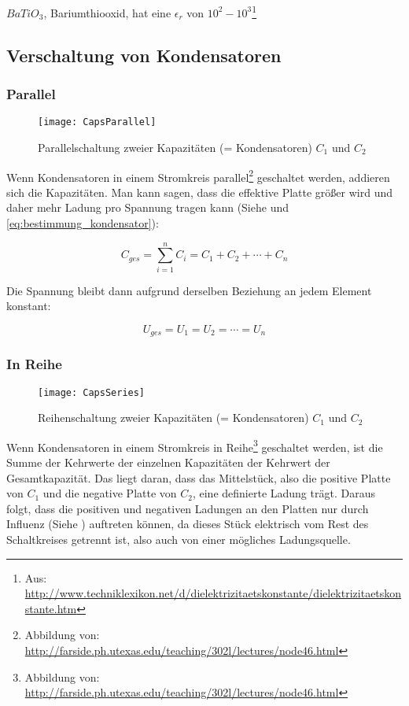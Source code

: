 \begin{NiceToKnow}
$BaTiO_3$, Bariumthiooxid, hat eine $\epsilon_r$ von $10^2-10^3$\footnote{Aus: \url{http://www.techniklexikon.net/d/dielektrizitaetskonstante/dielektrizitaetskonstante.htm}}
\end{NiceToKnow}


\subsection{Verschaltung von Kondensatoren}

\subsubsection{Parallel}

\begin{figure}[h!]
	\centering
	\texttt{[image: CapsParallel]}
	\caption{Parallelschaltung zweier Kapazitäten (= Kondensatoren) $C_1$ und $C_2$}
\end{figure}

Wenn Kondensatoren in einem Stromkreis parallel\footnote{Abbildung von: \url{http://farside.ph.utexas.edu/teaching/302l/lectures/node46.html}} geschaltet werden, addieren sich die Kapazitäten. Man kann sagen, dass die effektive Platte größer wird und daher mehr Ladung pro Spannung tragen kann (Siehe  und \ref{eq:bestimmung_kondensator}):

\begin{equation}
	C_{ges} = \sum\limits_{i=1}^n C_i = C_1 + C_2 + \cdots + C_n
\end{equation}

\noindent Die Spannung bleibt dann aufgrund derselben Beziehung an jedem Element konstant:

\begin{equation}
	U_{ges} = U_1 = U_2 = \cdots = U_n
\end{equation}


\subsubsection{In Reihe}

\begin{figure}[h!]
	\centering
	\texttt{[image: CapsSeries]}
	\caption{Reihenschaltung zweier Kapazitäten (= Kondensatoren) $C_1$ und $C_2$}
\end{figure}

Wenn Kondensatoren in einem Stromkreis in Reihe\footnote{Abbildung von: \url{http://farside.ph.utexas.edu/teaching/302l/lectures/node46.html}} geschaltet werden, ist die Summe der Kehrwerte der einzelnen Kapazitäten der Kehrwert der Gesamtkapazität. Das liegt daran, dass das \glqq Mittelstück\grqq , also die positive Platte von $C_1$ und die negative Platte von $C_2$, eine definierte Ladung trägt. Daraus folgt, dass die positiven und negativen Ladungen an den Platten nur durch Influenz (Siehe ) auftreten können, da dieses Stück elektrisch vom Rest des Schaltkreises getrennt ist, also auch von einer mögliches Ladungsquelle.

